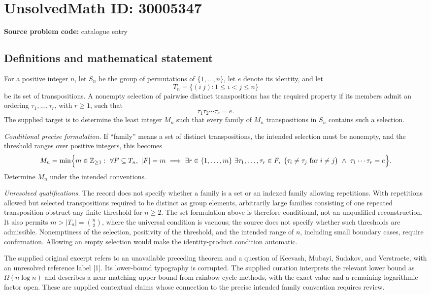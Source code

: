 \documentclass[11pt]{article}
\newcommand{\Z}{\mathbb{Z}}
\begin{document}
\section*{UnsolvedMath ID: 30005347}
\textbf{Source problem code:} catalogue entry
\subsection{Definitions and mathematical statement}
For a positive integer \(n\), let \(S_n\) be the group of permutations of \(\{1,\ldots,n\}\), let \(e\) denote its identity, and let
\[
T_n=\{(i\ j):1\leq i<j\leq n\}
\]
be its set of transpositions. A nonempty selection of pairwise distinct transpositions has the required property if its members admit an ordering \(\tau_1,\ldots,\tau_r\), with \(r\geq1\), such that
\[
\tau_1\tau_2\cdots\tau_r=e.
\]
The supplied target is to determine the least integer \(M_n\) such that every family of \(M_n\) transpositions in \(S_n\) contains such a selection.

\emph{Conditional precise formulation.} If ``family'' means a set of distinct transpositions, the intended selection must be nonempty, and the threshold ranges over positive integers, this becomes
\[
M_n=\min\Bigl\{m\in\Z_{\geq1}:\ \forall F\subseteq T_n,\ |F|=m\ \Longrightarrow\ \exists r\in\{1,\ldots,m\}\ \exists\tau_1,\ldots,\tau_r\in F,
\ \bigl(\tau_i\ne\tau_j\text{ for }i\ne j\bigr)
\ \land\ \tau_1\cdots\tau_r=e\Bigr\}.
\]
Determine \(M_n\) under the intended conventions.

\emph{Unresolved qualifications.} The record does not specify whether a family is a set or an indexed family allowing repetitions. With repetitions allowed but selected transpositions required to be distinct as group elements, arbitrarily large families consisting of one repeated transposition obstruct any finite threshold for \(n\geq2\). The set formulation above is therefore conditional, not an unqualified reconstruction. It also permits \(m>|T_n|=\binom n2\), where the universal condition is vacuous; the source does not specify whether such thresholds are admissible. Nonemptiness of the selection, positivity of the threshold, and the intended range of \(n\), including small boundary cases, require confirmation. Allowing an empty selection would make the identity-product condition automatic.

The supplied original excerpt refers to an unavailable preceding theorem and a question of Keevash, Mubayi, Sudakov, and Verstraete, with an unresolved reference label [1]. Its lower-bound typography is corrupted. The supplied curation interprets the relevant lower bound as \(\Omega(n\log n)\) and describes a near-matching upper bound from rainbow-cycle methods, with the exact value and a remaining logarithmic factor open. These are supplied contextual claims whose connection to the precise intended family convention requires review.
\end{document}

